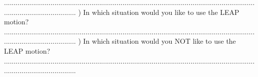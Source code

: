 \newline\newline
......................................................................................................................................................................
\newline{}) In which situation would you like to use the LEAP motion?
\newline\newline
......................................................................................................................................................................
\newline{}) In which situation would you NOT like to use the LEAP motion?
\newline\newline
......................................................................................................................................................................
\newline
